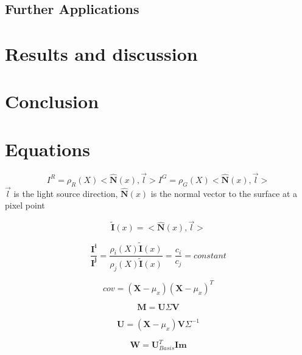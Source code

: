 \documentclass{article}\twocolumn
\begin{document}

\subsection{Further Applications}


\section{Results and discussion}

\section{Conclusion}


\section{Equations} 
\begin{equation}
    I^{R} = \rho _{R}(X)<\hat{\mathbf{N}}(x),\vec{l}>
    I^{G} = \rho _{G}(X)<\hat{\mathbf{N}}(x),\vec{l}>
\end{equation}
$\vec{l}$ is the light source direction, $\hat{\mathbf{N}}(x)$ is the normal vector to the surface at a pixel point

\begin{equation}
    \tilde{\mathbf{I}}(x) = <\hat{\mathbf{N}}(x),\vec{l}>
\end{equation}

\begin{equation}
    \frac{\mathbf{I^{i}}}{\mathbf{I^{j}}} = \frac{\rho _{i}(X)\tilde{\mathbf{I}}(x)}{\rho _{j}(X)\tilde{\mathbf{I}}(x)} = \frac{c_{i}}{c_{j}} = constant
\end{equation}

\begin{equation}
    cov = (\textbf{X} - \mu_{x})(\textbf{X} - \mu_{x})^{T}
\end{equation}

\begin{equation}
    \textbf{M} = \textbf{U} \textbf{$\Sigma$} \textbf{V}
\end{equation}

\begin{equation}
    \textbf{U} = (\textbf{X} - \mu_{x}) \textbf{V} \Sigma^{-1}
\end{equation}

\begin{equation}
    \textbf{W} = \textbf{U}_{Basis}^{T} \textbf{Im}
\end{equation}




\end{document}
